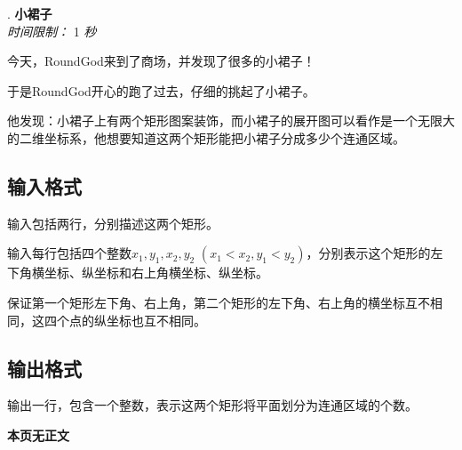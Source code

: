 ﻿\addtocounter{ProblemNo}{1}
\renewcommand{\ProblemName}{小裙子}
\begin{center}
\huge{. \textbf{\ProblemName}} \\ [0.8cm]
\large{\textit{时间限制：} 1 \textit{秒}} \\ [1cm] 
\end{center}

今天，RoundGod来到了商场，并发现了很多的小裙子！

于是RoundGod开心的跑了过去，仔细的挑起了小裙子。

他发现：小裙子上有两个矩形图案装饰，而小裙子的展开图可以看作是一个无限大的二维坐标系，他想要知道这两个矩形能把小裙子分成多少个连通区域。

\subsection*{输入格式}

输入包括两行，分别描述这两个矩形。

输入每行包括四个整数$x_1, y_1, x_2, y_2$ $(x_1 < x_2, y_1 < y_2)$，分别表示这个矩形的左下角横坐标、纵坐标和右上角横坐标、纵坐标。

保证第一个矩形左下角、右上角，第二个矩形的左下角、右上角的横坐标互不相同，这四个点的纵坐标也互不相同。

\subsection*{输出格式}

输出一行，包含一个整数，表示这两个矩形将平面划分为连通区域的个数。

\setcounter{ExampleNo}{0}


\clearpage

\ifodd\value{page}
\else
    \vspace*{\fill}
    \begin{center}
    \textbf{\Large 本页无正文}
    \end{center}
    \vspace*{\fill}
    \clearpage
\fi

